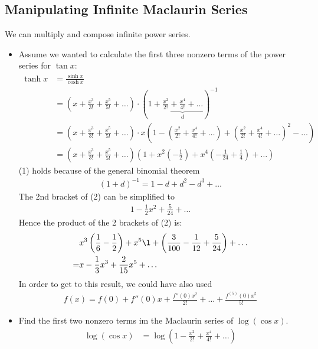 \subsection{Manipulating Infinite Maclaurin Series}
We can multiply and compose infinite power series.
\begin{ex}
	\begin{itemize}
	\item
	Assume we wanted to calculate the first three nonzero terms of the power series for $\tan x$:
	\begin{align*}
	\tanh x & = \frac{\sinh x}{\cosh x} \\
	& = \left( x+ \frac{x^3}{3!} + \frac{x^5}{5!} + \dots \right) \cdot \left( 1 + \underbrace{\frac{x^2}{2!} + \frac{x^4}{4!} + \dots}_d \right) ^{-1} \tag{1} \\
	& = \left( x+ \frac{x^3}{3!} + \frac{x^5}{5!} + \dots \right) \cdot x \left( 1 - \left( \frac{x^2}{2!} + \frac{x^4}{4!} + \dots \right) + \left( \frac{x^2}{2!} + \frac{x^4}{4!} + \dots \right)^2 - \dots \right) \\	
	& = \left( x + \frac{x^3}{3!} + \frac{x^5}{5!} + \dots \right) \left( 1 + x^2 \left( -\frac 1 2\right) + x^4 \left( - \frac 1 {24} + \frac 1 4 \right) + \dots  \right) \tag{2}
	\end{align*}
	(1) holds because of the general binomial theorem
	\begin{align*}
		(1+d)^{-1} = 1 -d + d^2 -d^3 + \dots 
	\end{align*}
	The 2nd bracket of (2) can be simplified to
	\begin{align*}
		 1- \frac 1 2 x^2 + \frac 5 {24} + \dots
	\end{align*}
	Hence the product of the 2 brackets of (2) is:
	\begin{align*}
		 & x^3 \left( \frac 1 6 - \frac 1 2 \right) + x^5 \l + \left( \frac 3 {100} - \frac 1 {12} + \frac 5 {24} \right) + \dots \\
		 = & x - \frac 1 3 x^3 + \frac 2 {15} x^5 + \dots 		
	\end{align*}
	In order to get to this result, we could have also used 
	\begin{align*}
	f(x) = f(0) + f''(0) x + \frac{f''(0) x^2}{2!} + \dots + \frac{f^{(5)}(0) x^5}{5!}
	\end{align*}
	\item
	Find the first two nonzero terms im the Maclaurin series of $\log(\cos x)$.
	\begin{align*}
	\log(\cos x) & = \log \left( 1- \frac{x^2}{2!} + \frac{x^4}{4!} + \dots \right) \\

\end{align*}
\end{itemize}
\end{ex}
